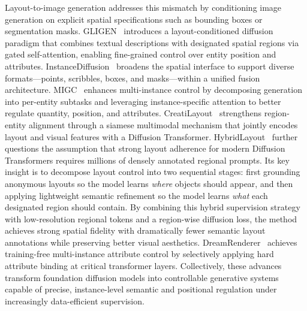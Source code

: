 Layout-to-image generation addresses this mismatch by conditioning image generation on explicit spatial specifications such as bounding boxes or segmentation masks. GLIGEN~\citep{li2023gligen} introduces a layout-conditioned diffusion paradigm that combines textual descriptions with designated spatial regions via gated self-attention, enabling fine-grained control over entity position and attributes. InstanceDiffusion~\citep{wang2024instancediffusion} broadens the spatial interface to support diverse formats---points, scribbles, boxes, and masks---within a unified fusion architecture. MIGC~\citep{zhou2024migc} enhances multi-instance control by decomposing generation into per-entity subtasks and leveraging instance-specific attention to better regulate quantity, position, and attributes. CreatiLayout~\citep{CreatiLayout} strengthens region-entity alignment through a siamese multimodal mechanism that jointly encodes layout and visual features with a Diffusion Transformer. HybridLayout~\citep{wu2025hybrid} further questions the assumption that strong layout adherence for modern Diffusion Transformers requires millions of densely annotated regional prompts. Its key insight is to decompose layout control into two sequential stages: first grounding anonymous layouts so the model learns \emph{where} objects should appear, and then applying lightweight semantic refinement so the model learns \emph{what} each designated region should contain. By combining this hybrid supervision strategy with low-resolution regional tokens and a region-wise diffusion loss, the method achieves strong spatial fidelity with dramatically fewer semantic layout annotations while preserving better visual aesthetics. DreamRenderer~\citep{zhou2025dreamrenderer} achieves training-free multi-instance attribute control by selectively applying hard attribute binding at critical transformer layers. Collectively, these advances transform foundation diffusion models into controllable generative systems capable of precise, instance-level semantic and positional regulation under increasingly data-efficient supervision.

